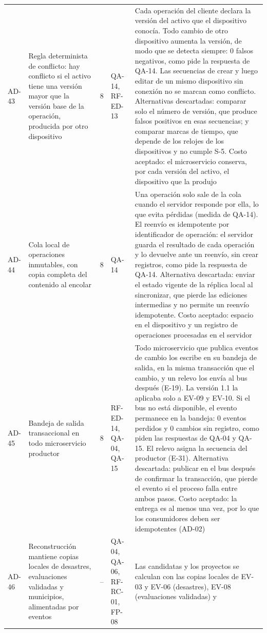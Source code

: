 \documentclass[11pt,letterpaper]{article}
\begin{document}
\begin{longtable}{L{1.15cm} L{3.5cm} L{0.7cm} L{1.9cm} L{8.0cm}}
AD-43 & Regla determinista de conflicto: hay conflicto si el activo tiene una versión mayor que la
versión base de la operación, producida por otro dispositivo & 8 & QA-14, RF-ED-13 & Cada operación
del cliente declara la versión del activo que el dispositivo conocía. Todo cambio de otro
dispositivo aumenta la versión, de modo que se detecta siempre: 0 falsos negativos, como pide la respuesta de QA-14. Las
secuencias de crear y luego editar de un mismo dispositivo sin conexión no se marcan como conflicto.
Alternativas descartadas: comparar solo el número de versión, que produce falsos positivos en esas
secuencias; y comparar marcas de tiempo, que depende de los relojes de los dispositivos y no cumple
S-5. Costo aceptado: el microservicio conserva, por cada versión del activo, el dispositivo que la
produjo \\
AD-44 & Cola local de operaciones inmutables, con copia completa del contenido al encolar & 8 &
QA-14 & Una operación solo sale de la cola cuando el servidor responde por ella, lo que evita
pérdidas (medida de QA-14). El reenvío es idempotente por identificador de operación: el servidor guarda el
resultado de cada operación y lo devuelve ante un reenvío, sin crear registros, como pide la respuesta de QA-14.
Alternativa descartada: enviar el estado vigente de la réplica local al sincronizar, que pierde las
ediciones intermedias y no permite un reenvío idempotente. Costo aceptado: espacio en el
dispositivo y un registro de operaciones procesadas en el servidor \\
AD-45 & Bandeja de salida transaccional en todo microservicio productor & 8 & RF-ED-14, QA-04,
QA-15 & Todo microservicio que publica eventos de cambio los escribe en su bandeja de salida, en la
misma transacción que el cambio, y un relevo los envía al bus después (E-19). La versión 1.1 la
aplicaba solo a EV-09 y EV-10. Si el bus no está disponible, el evento permanece en la bandeja: 0
eventos perdidos y 0 cambios sin registro, como piden las respuestas de QA-04 y QA-15. El relevo asigna la secuencia del
productor (E-31). Alternativa descartada: publicar en el bus después de confirmar la transacción,
que pierde el evento si el proceso falla entre ambos pasos. Costo aceptado: la entrega es al menos
una vez, por lo que los consumidores deben ser idempotentes (AD-02) \\
AD-46 & Reconstrucción mantiene copias locales de desastres, evaluaciones validadas y municipios,
alimentadas por eventos & -- & QA-04, QA-06, RF-RC-01, FP-08 & Las candidatas y los proyectos se
calculan con las copias locales de EV-03 y EV-06 (desastres), EV-08 (evaluaciones validadas) y

\end{longtable}
\end{document}
